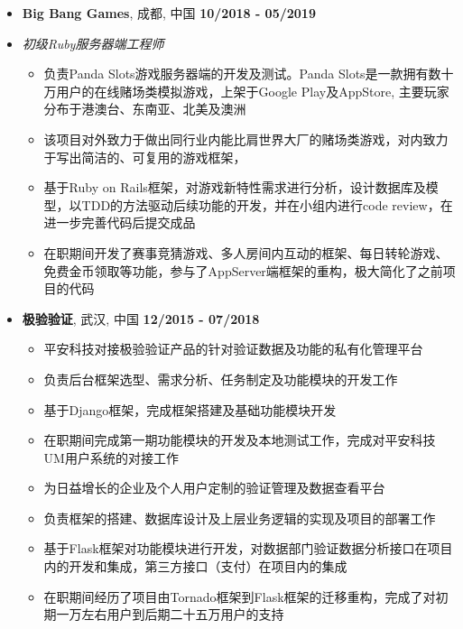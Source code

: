 \documentclass[UTF8, 12pt, a4paper,sans]{moderncv}       %
\begin{document}
    \begin{itemize}

        \item{\textbf{Big Bang Games}, {成都, 中国} \hfill\textbf{10/2018 - 05/2019}}
        \item{\textit{初级Ruby服务器端工程师}}
        \vspace{2pt}
        \begin{itemize}
            \item {\medium 负责Panda Slots游戏服务器端的开发及测试。Panda Slots是一款拥有数十万用户的在线赌场类模拟游戏，上架于Google Play及AppStore, 主要玩家分布于港澳台、东南亚、北美及澳洲}
            \vspace{2pt}
            \item {\medium 该项目对外致力于做出同行业内能比肩世界大厂的赌场类游戏，对内致力于写出简洁的、可复用的游戏框架，}
            \vspace{2pt}
            \item {\medium 基于Ruby on Rails框架，对游戏新特性需求进行分析，设计数据库及模型，以TDD的方法驱动后续功能的开发，并在小组内进行code review，在进一步完善代码后提交成品}
            \vspace{2pt}
            \item {\medium 在职期间开发了赛事竞猜游戏、多人房间内互动的框架、每日转轮游戏、免费金币领取等功能，参与了AppServer端框架的重构，极大简化了之前项目的代码}
        \end{itemize}


        \vspace{8pt}


        \item{\textbf{极验验证}, {武汉, 中国} \hfill\textbf{12/2015 - 07/2018}}
        \begin{itemize}
            \item { \medium 平安科技对接极验验证产品的针对验证数据及功能的私有化管理平台}
            \item { \medium 负责后台框架选型、需求分析、任务制定及功能模块的开发工作}
            \item { \medium 基于Django框架，完成框架搭建及基础功能模块开发}
            \item { \medium 在职期间完成第一期功能模块的开发及本地测试工作，完成对平安科技UM用户系统的对接工作}
        \end{itemize}

        \begin{itemize}
            \item { \medium 为日益增长的企业及个人用户定制的验证管理及数据查看平台}
            \item { \medium 负责框架的搭建、数据库设计及上层业务逻辑的实现及项目的部署工作}
            \item { \medium 基于Flask框架对功能模块进行开发，对数据部门验证数据分析接口在项目内的开发和集成，第三方接口（支付）在项目内的集成}
            \item { \medium 在职期间经历了项目由Tornado框架到Flask框架的迁移重构，完成了对初期一万左右用户到后期二十五万用户的支持}
        \end{itemize}


\end{itemize}
\end{document}
